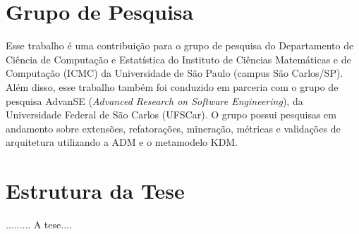 \section{Grupo de Pesquisa}

Esse trabalho é uma contribuição para o grupo de pesquisa do Departamento de Ciência de Computação e Estatística do Instituto de Ciências Matemáticas e de Computação (ICMC) da Universidade de São Paulo (campus São Carlos/SP). Além disso, esse trabalho também foi conduzido em parceria com o grupo de pesquisa AdvanSE (\textit{Advanced Research on Software Engineering}), da Universidade Federal de São Carlos (UFSCar). O grupo possui pesquisas em andamento sobre extensões, refatorações, mineração, métricas e validações de arquitetura utilizando a ADM e o metamodelo KDM.

\section{Estrutura da Tese}

......... A tese....